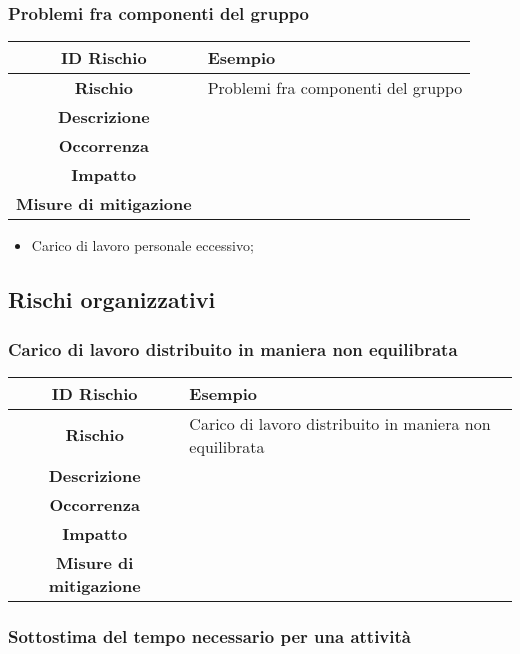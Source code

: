 \documentclass[10pt, a4paper]{article}
\begin{document}
{\subsubsection{Problemi fra componenti del gruppo}

{\renewcommand{\arraystretch}{1.5}
\begin{tabularx}{\textwidth}{c|X}
\textbf{ID Rischio} & Esempio \\
\hline
\textbf{Rischio} & Problemi fra componenti del gruppo  \\
\hline
\textbf{Descrizione} & \\
\hline
\textbf{Occorrenza} & \\
\hline
\textbf{Impatto} & \\
\hline
\textbf{Misure di mitigazione} & \\
\end{tabularx}

\begin{itemize}
    \item Carico di lavoro personale eccessivo;\\ 
     
\end{itemize}


\subsection{Rischi organizzativi}

\subsubsection{Carico di lavoro distribuito in maniera non equilibrata}

{\renewcommand{\arraystretch}{1.5}
\begin{tabularx}{\textwidth}{c|X}
\textbf{ID Rischio} & Esempio \\
\hline
\textbf{Rischio} & Carico di lavoro distribuito in maniera non equilibrata \\
\hline
\textbf{Descrizione} & \\
\hline
\textbf{Occorrenza} & \\
\hline
\textbf{Impatto} & \\
\hline
\textbf{Misure di mitigazione} & \\
\end{tabularx}

\subsubsection{Sottostima del tempo necessario per una attività}

}}}
\end{document}
